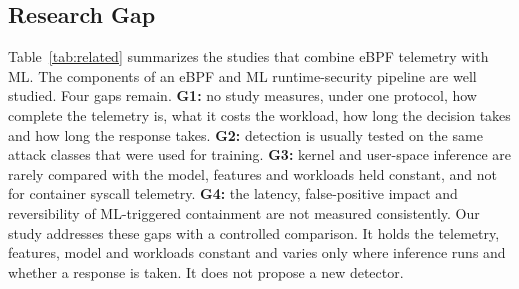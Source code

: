 \subsection{Research Gap}

Table~\ref{tab:related} summarizes the studies that combine eBPF telemetry with ML. The components of an eBPF and ML runtime-security pipeline are well studied. Four gaps remain. \textbf{G1:} no study measures, under one protocol, how complete the telemetry is, what it costs the workload, how long the decision takes and how long the response takes. \textbf{G2:} detection is usually tested on the same attack classes that were used for training. \textbf{G3:} kernel and user-space inference are rarely compared with the model, features and workloads held constant, and not for container syscall telemetry. \textbf{G4:} the latency, false-positive impact and reversibility of ML-triggered containment are not measured consistently. Our study addresses these gaps with a controlled comparison. It holds the telemetry, features, model and workloads constant and varies only where inference runs and whether a response is taken. It does not propose a new detector.

